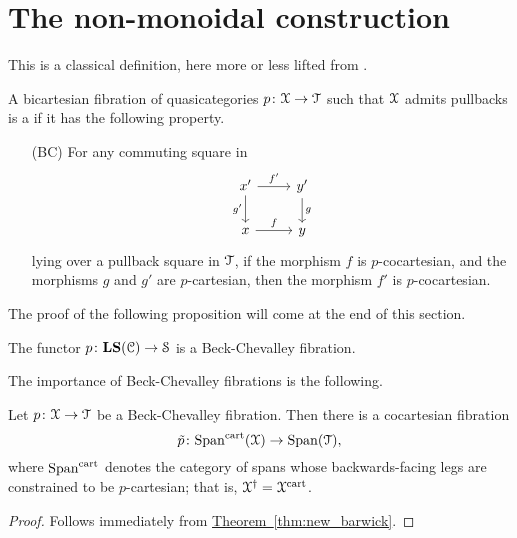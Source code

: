 \documentclass[main.tex]{subfiles}
\begin{document}
\section{The non-monoidal construction}
\label{sec:the_non_monoidal_construction}

This is a classical definition, here more or less lifted from \cite{luriehopkins2013ambidexterity}.

\begin{definition}
  \label{def:beck_chevalley_fibration}
  A bicartesian fibration of quasicategories $p\colon \mathcal{X} \to \mathcal{T}$ such that $\mathcal{X}$ admits pullbacks is a  if it has the following property.
  \begin{itemize}
    \item[(BC)]\label{item:beck_chevalley_condition} For any commuting square in
      \begin{equation*}
        \begin{tikzcd}
          x'
          \arrow[r, "f'"]
          \arrow[d, swap, "g'"]
          & y'
          \arrow[d, "g"]
          \\
          x
          \arrow[r, "f"]
          & y
        \end{tikzcd}
      \end{equation*}
      lying over a pullback square in $\mathcal{T}$, if the morphism $f$ is $p$-cocartesian, and the morphisms $g$ and $g'$ are $p$-cartesian, then the morphism $f'$ is $p$-cocartesian.
  \end{itemize}
\end{definition}

The proof of the following proposition will come at the end of this section.

\begin{proposition}
  \label{prop:local_systems_are_beck_chevalley}
  The functor $p\colon \mathbf{LS}(\mathcal{C}) \to \mathcal{S}$ is a Beck-Chevalley fibration.
\end{proposition}

The importance of Beck-Chevalley fibrations is the following.

\begin{proposition}
  Let $p\colon \mathcal{X} \to \mathcal{T}$ be a Beck-Chevalley fibration. Then there is a cocartesian fibration
  \begin{equation*}
    \tilde{p}\colon \mathrm{Span}^{\mathrm{cart}}(\mathcal{X}) \to \mathrm{Span}(\mathcal{T}),
  \end{equation*}
  where $\mathrm{Span}^{\mathrm{cart}}$ denotes the category of spans whose backwards-facing legs are constrained to be $p$-cartesian; that is, $\mathcal{X}^{\dagger} = \mathcal{X}^{\mathrm{cart}}$.
\end{proposition}
\begin{proof}
  Follows immediately from \hyperref[thm:new_barwick]{Theorem~\ref*{thm:new_barwick}}.
\end{proof}
\end{document}
